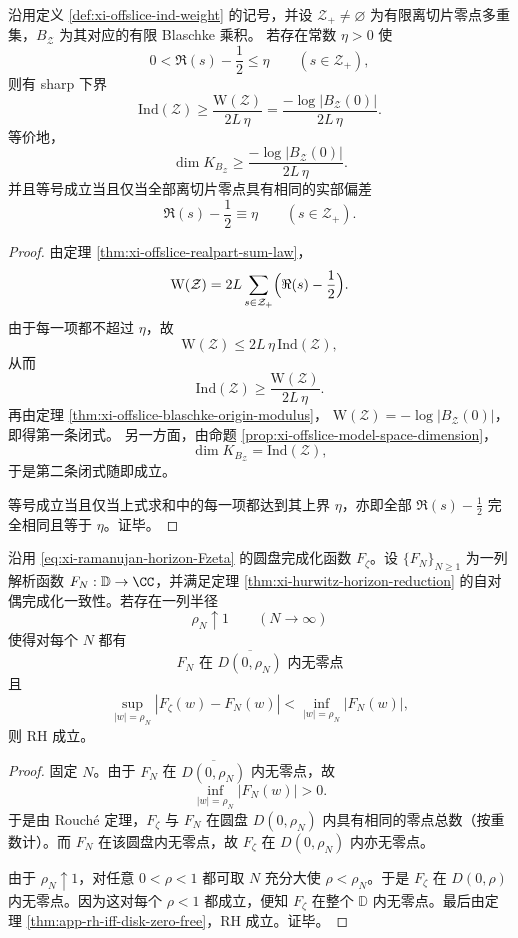 \begin{theorem}\label{thm:xi-time-part65e-strip-blaschke-origin-modulus-index-lower-bound}
沿用定义 \ref{def:xi-offslice-ind-weight} 的记号，并设 \(\mathcal Z_{+}\neq\varnothing\) 为有限离切片零点多重集，\(B_{\mathcal Z}\) 为其对应的有限 Blaschke 乘积。
若存在常数 \(\eta>0\) 使
\[
0<\Re(s)-\frac12\le \eta
\qquad(s\in\mathcal Z_{+}),
\]
则有 sharp 下界
\[
\boxed{\;
\mathrm{Ind}(\mathcal Z)
\ge
\frac{\mathrm W(\mathcal Z)}{2L\,\eta}
=
\frac{-\log|B_{\mathcal Z}(0)|}{2L\,\eta}.\;}
\]
等价地，
\[
\boxed{\;
\dim K_{B_{\mathcal Z}}
\ge
\frac{-\log|B_{\mathcal Z}(0)|}{2L\,\eta}.\;}
\]
并且等号成立当且仅当全部离切片零点具有相同的实部偏差
\[
\Re(s)-\frac12\equiv \eta
\qquad(s\in\mathcal Z_{+}).
\]
\end{theorem}
\begin{proof}
由定理 \ref{thm:xi-offslice-realpart-sum-law}，
\[
\mathrm W(\mathcal Z)
=
2L\sum_{s\in\mathcal Z_{+}}
\Bigl(\Re(s)-\frac12\Bigr).
\]
由于每一项都不超过 \(\eta\)，故
\[
\mathrm W(\mathcal Z)\le 2L\,\eta\,\mathrm{Ind}(\mathcal Z),
\]
从而
\[
\mathrm{Ind}(\mathcal Z)\ge \frac{\mathrm W(\mathcal Z)}{2L\,\eta}.
\]
再由定理 \ref{thm:xi-offslice-blaschke-origin-modulus}，
\(
\mathrm W(\mathcal Z)=-\log|B_{\mathcal Z}(0)|
\)，
即得第一条闭式。
另一方面，由命题 \ref{prop:xi-offslice-model-space-dimension}，
\[
\dim K_{B_{\mathcal Z}}=\mathrm{Ind}(\mathcal Z),
\]
于是第二条闭式随即成立。

等号成立当且仅当上式求和中的每一项都达到其上界 \(\eta\)，亦即全部 \(\Re(s)-\tfrac12\) 完全相同且等于 \(\eta\)。证毕。
\end{proof}

\begin{theorem}\label{thm:xi-time-part65e-rouche-boundary-margin-rh-certificate}
沿用 \eqref{eq:xi-ramanujan-horizon-Fzeta} 的圆盘完成化函数 \(F_{\zeta}\)。设 \(\{F_N\}_{N\ge 1}\) 为一列解析函数 \(F_N:\mathbb{D}\to\CC\)，并满足定理 \ref{thm:xi-hurwitz-horizon-reduction} 的自对偶完成化一致性。若存在一列半径
\[
\rho_N\uparrow 1
\qquad(N\to\infty)
\]
使得对每个 \(N\) 都有
\[
F_N\text{ 在 }\overline{D(0,\rho_N)}\text{ 内无零点}
\]
且
\[
\sup_{|w|=\rho_N}|F_{\zeta}(w)-F_N(w)|
<
\inf_{|w|=\rho_N}|F_N(w)|,
\]
则 RH 成立。
\end{theorem}
\begin{proof}
固定 \(N\)。由于 \(F_N\) 在 \(\overline{D(0,\rho_N)}\) 内无零点，故
\[
\inf_{|w|=\rho_N}|F_N(w)|>0.
\]
于是由 Rouch\'e 定理，\(F_{\zeta}\) 与 \(F_N\) 在圆盘 \(D(0,\rho_N)\) 内具有相同的零点总数（按重数计）。而 \(F_N\) 在该圆盘内无零点，故 \(F_{\zeta}\) 在 \(D(0,\rho_N)\) 内亦无零点。

由于 \(\rho_N\uparrow 1\)，对任意 \(0<\rho<1\) 都可取 \(N\) 充分大使 \(\rho<\rho_N\)。于是 \(F_{\zeta}\) 在 \(D(0,\rho)\) 内无零点。因为这对每个 \(\rho<1\) 都成立，便知 \(F_{\zeta}\) 在整个 \(\mathbb D\) 内无零点。最后由定理 \ref{thm:app-rh-iff-disk-zero-free}，RH 成立。证毕。
\end{proof}

